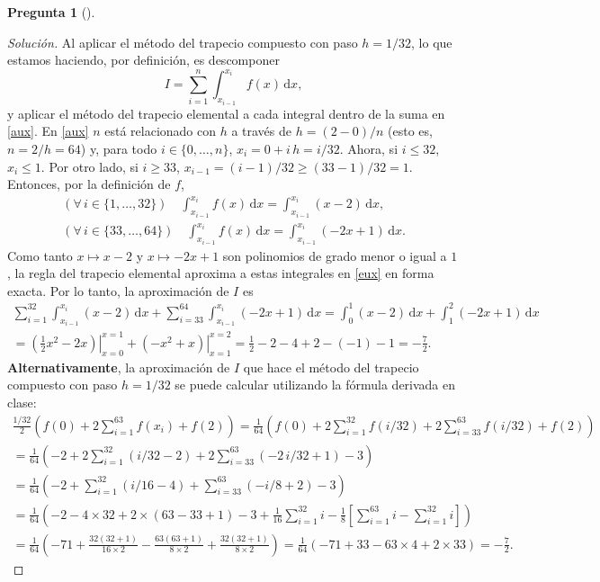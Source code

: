 \documentclass[letter,12pt]{article}
\theoremstyle{definition}
\newtheorem{question}{Pregunta}
\numberwithin{equation}{question}
\newenvironment{solution}{\begin{proof}[Solución]}{\end{proof}}
\begin{document}
\begin{question}[]
\begin{solution}
Al aplicar el método del trapecio compuesto con paso $h = 1/32$, lo que estamos haciendo, por definición, es descomponer
%
\begin{equation}\label{aux}
I = \sum_{i=1}^{n} \int_{x_{i-1}}^{x_i} f(x) \, \mathrm{d}x,
\end{equation}
%
y aplicar el método del trapecio elemental a cada integral dentro de la suma en \eqref{aux}.
En \eqref{aux} $n$ está relacionado con $h$ a través de $h = (2-0)/n$ (esto es, $n = 2/h = 64$) y, para todo $i \in \{0, \dotsc, n\}$, $x_i = 0 + i\,h = i/32$.
Ahora, si $i \leq 32$, $x_i \leq 1$.
Por otro lado, si $i \geq 33$, $x_{i-1} = (i-1)/32 \geq (33-1)/32 = 1$.
Entonces, por la definición de $f$,
%
\begin{subequations}\label{eux}
\begin{gather}
(\forall\,i\in\{1,\dotsc,32\}) \quad \int_{x_{i-1}}^{x_i} f(x) \,\mathrm{d}x = \int_{x_{i-1}}^{x_i} (x-2) \,\mathrm{d}x,\\
(\forall\,i\in\{33,\dotsc,64\}) \quad \int_{x_{i-1}}^{x_i} f(x) \,\mathrm{d}x = \int_{x_{i-1}}^{x_i} (-2x+1) \,\mathrm{d}x.
\end{gather}
\end{subequations}
%
Como tanto $x \mapsto x-2$ y $x \mapsto -2x+1$ son polinomios de grado menor o igual a $1$, la regla del trapecio elemental aproxima a estas integrales en \eqref{eux} en forma exacta.
Por lo tanto, la aproximación de $I$ es
%
\begin{multline*}
\sum_{i=1}^{32} \int_{x_{i-1}}^{x_i} (x-2) \,\mathrm{d}x + \sum_{i=33}^{64} \int_{x_{i-1}}^{x_i} (-2x+1) \, \mathrm{d}x
= \int_0^1 (x-2) \, \mathrm{d}x + \int_1^2 (-2x+1) \, \mathrm{d} x\\
= \left.\left(\frac{1}{2} x^2 - 2x \right)\right|_{x=0}^{x=1} + \left.\left(-x^2 + x\right)\right|_{x=1}^{x=2}
= \frac{1}{2} - 2 -4 + 2 - (-1) - 1
= -\frac{7}{2}.
\end{multline*}
%
\textbf{Alternativamente}, la aproximación de $I$ que hace el método del trapecio compuesto con paso $h = 1/32$ se puede calcular utilizando la fórmula derivada en clase:
%
\begin{multline*}
\frac{1/32}{2} \left(f(0) + 2 \sum_{i=1}^{63} f(x_i) + f(2)\right)
= \frac{1}{64} \left(f(0) + 2 \sum_{i=1}^{32} f(i/32) + 2 \sum_{i=33}^{63} f(i/32) + f(2)\right)\\
= \frac{1}{64} \left(-2 + 2 \sum_{i=1}^{32} (i/32-2) + 2 \sum_{i=33}^{63} (-2\,i/32 + 1) -3\right)\\
= \frac{1}{64} \left(-2 + \sum_{i=1}^{32} (i/16-4) + \sum_{i=33}^{63} (-i/8 + 2) -3\right)\\
= \frac{1}{64} \left(-2 - 4\times 32 + 2\times(63-33+1) - 3 + \frac{1}{16} \sum_{i=1}^{32} i - \frac{1}{8} \left[\sum_{i=1}^{63} i - \sum_{i=1}^{32} i\right]\right)\\
= \frac{1}{64} \left(-71 + \frac{32(32+1)}{16 \times 2} - \frac{63(63+1)}{8 \times 2} + \frac{32(32+1)}{8\times2} \right)
= \frac{1}{64}\left(-71 + 33 - 63\times 4 + 2 \times 33\right) = -\frac{7}{2}.
\end{multline*}
%
\end{solution}
\end{question}
\end{document}
